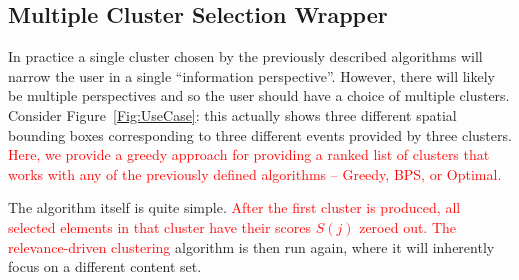 \subsection{Multiple Cluster Selection Wrapper}

In practice a single cluster chosen by the previously described algorithms will narrow the user in a single \textquotedblleft information perspective\textquotedblright{}. However, there will likely be multiple perspectives and so the user should have a choice of multiple clusters.  
Consider Figure~\ref{Fig:UseCase}: this actually shows three different spatial bounding boxes corresponding to three different events provided by three clusters.
\textcolor{red}{Here, we provide a greedy approach for providing a ranked list of clusters that works with any of the previously defined algorithms -- Greedy, BPS, or Optimal.}%

The algorithm itself is quite simple.  \textcolor{red}{After the first cluster is produced, all selected elements in that cluster have their scores $S(j)$ zeroed out.  The relevance-driven clustering }algorithm is then run again, where it will inherently focus on a different content set.  










